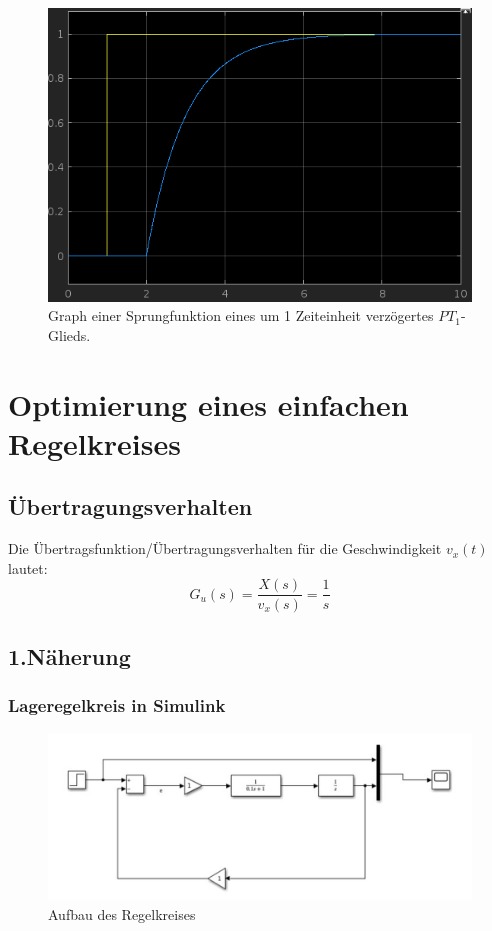 \documentclass{article}
\begin{document}
			\subsubsection{}
				\begin{figure}[ht]
					\includegraphics[scale=0.4, center]{./Sprungfunktion_PT_1_Glied_verzoegert.png}
					\caption{Graph einer Sprungfunktion eines um 1 Zeiteinheit verzögertes $PT_1$-Glieds.}
					\label{fig3: Springfunktion-PT-1-Glied}
				\end{figure}	
\newpage
	\section{Optimierung eines einfachen Regelkreises}
		\subsection{Übertragungsverhalten}
			Die Übertragsfunktion/Übertragungsverhalten für die Geschwindigkeit $v_x(t)$ lautet:
			$$G_u(s) = \frac{X(s)}{v_x(s)} = \frac{1}{s}$$
		
		\subsection{1.Näherung}
			\subsubsection{Lageregelkreis in Simulink}
				\begin{figure}[h]
					\includegraphics[scale=0.4, center]{2_b_1_Regelkreis.png}
					\caption{Aufbau des Regelkreises}
					\label{fig4: Lageregelkreis_b_1}
				\end{figure}
\newpage
\end{document}
